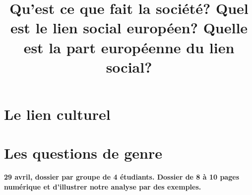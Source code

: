 \documentclass[12pt,a4paper]{report}
\begin{document}
\title{Qu'est ce que fait la société? Quel est le lien social européen? Quelle est la part européenne du lien social? } 
\maketitle

\tableofcontents





\chapter{Le lien culturel}
\chapter{Les questions de genre}

\textbf{29 avril, dossier par groupe de 4 étudiants.
Dossier de 8 à 10 pages numérique et d'illustrer notre analyse par des exemples.}
\end{document}
